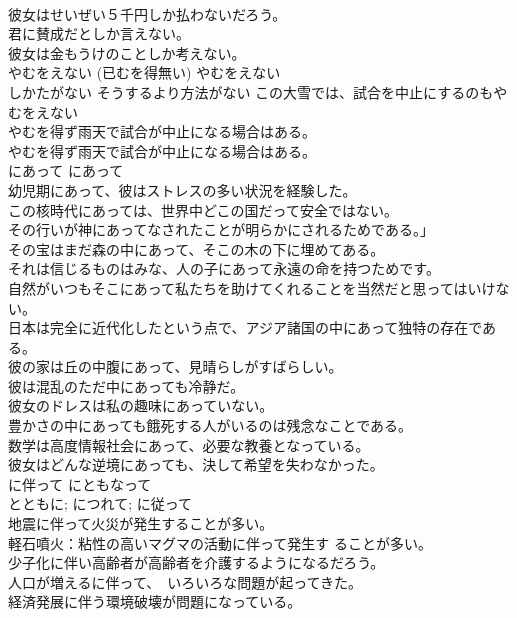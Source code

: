 \documentclass[8pt]{extreport}
\begin{document}
\begin{CJK}{UTF8}{min}
\\	彼女はせいぜい５千円しか払わないだろう。   
\\	君に賛成だとしか言えない。   
\\	彼女は金もうけのことしか考えない。   
\\	やむをえない (已むを得無い)	やむをえない	
\\	しかたがない そうするより方法がない	この大雪では、試合を中止にするのもやむをえない 
\\	やむを得ず雨天で試合が中止になる場合はある。  
\\	やむを得ず雨天で試合が中止になる場合はある。  
\\	にあって	にあって	
\\	幼児期にあって、彼はストレスの多い状況を経験した。  
\\	この核時代にあっては、世界中どこの国だって安全ではない。   
\\	その行いが神にあってなされたことが明らかにされるためである。」   
\\	その宝はまだ森の中にあって、そこの木の下に埋めてある。   
\\	それは信じるものはみな、人の子にあって永遠の命を持つためです。   
\\	自然がいつもそこにあって私たちを助けてくれることを当然だと思ってはいけない。   
\\	日本は完全に近代化したという点で、アジア諸国の中にあって独特の存在である。   
\\	彼の家は丘の中腹にあって、見晴らしがすばらしい。   
\\	彼は混乱のただ中にあっても冷静だ。   
\\	彼女のドレスは私の趣味にあっていない。  
\\	豊かさの中にあっても餓死する人がいるのは残念なことである。   
\\	数学は高度情報社会にあって、必要な教養となっている。  
\\	彼女はどんな逆境にあっても、決して希望を失わなかった。   
\\	に伴って	にともなって	
\\	とともに; につれて; に従って	
\\	地震に伴って火災が発生することが多い。  
\\	軽石噴火：粘性の高いマグマの活動に伴って発生す ることが多い。  
\\	少子化に伴い高齢者が高齢者を介護するようになるだろう。  
\\	人口が増えるに伴って、　いろいろな問題が起ってきた。  
\\	経済発展に伴う環境破壊が問題になっている。  

\end{CJK}
\end{document}
